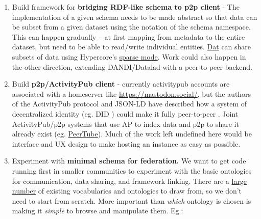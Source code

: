 \documentclass[10pt]{article}
\begin{document}
\begin{multicols}{2}
\begin{enumerate}
\item
  Build framework for \textbf{bridging RDF-like schema to p2p client} -
  The implementation of a given schema needs to be made abstract so that
  data can be subset from a given dataset using the notation of the
  schema namespace. This can happen gradually -- at first mapping from
  metadata to the entire dataset, but need to be able to read/write
  individual entities. \href{https://docs.dat.foundation/docs/faq}{Dat}
  can share subsets of data using Hypercore's
  \href{https://hypercore-protocol.org/guides/walkthroughs/creating-and-sharing-hypercores/}{sparse
  mode}. Work could also happen in the other direction, extending
  DANDI/Datalad with a peer-to-peer backend.
\item
  Build \textbf{p2p/ActivityPub client} - currently activitypub accounts
  are associated with a homeserver like \url{https://mastodon.social/},
  but the authors of the ActivityPub protocol and JSON-LD have described
  how a system of decentralized identity (eg. DID \cite{spornyDecentralizedIdentifiersDIDs2021} ) could make it fully
  peer-to-peer \cite{webberActivityPubDecentralizedDistributed2017} . Joint ActivityPub/p2p systems that use AP to index data and p2p
  to share it already exist (eg.
  \href{https://joinpeertube.org/\#what-is-peertube}{PeerTube}). Much of
  the work left undefined here would be interface and UX design to make
  hosting an instance as easy as possible.
\item
  Experiment with \textbf{minimal schema for federation.} We want to get
  code running first in smaller communities to experiment with the basic
  ontologies for communication, data sharing, and framework linking.
  There are a \href{https://lov.linkeddata.es/dataset/lov/vocabs}{large
  number} of existing vocabularies and ontologies to draw from, so we
  don't need to start from scratch. More important than \emph{which}
  ontology is chosen is making it \emph{simple} to browse and manipulate
  them. Eg.:

  \begin{itemize}
  

\end{itemize}
\end{enumerate}
\end{multicols}
\end{document}

